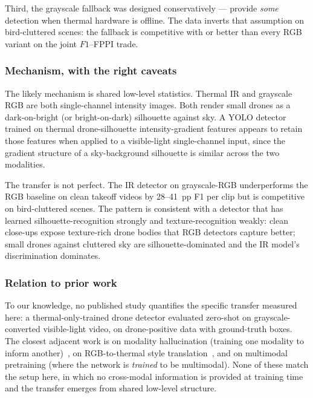 Third, the grayscale fallback was designed conservatively --- provide \emph{some} detection when thermal hardware is offline. The data inverts that assumption on bird-cluttered scenes: the fallback is competitive with or better than every RGB variant on the joint $F1$--FPPI trade.

\subsubsection{Mechanism, with the right caveats}

The likely mechanism is shared low-level statistics. Thermal IR and grayscale RGB are both single-channel intensity images. Both render small drones as a dark-on-bright (or bright-on-dark) silhouette against sky. A YOLO detector trained on thermal drone-silhouette intensity-gradient features appears to retain those features when applied to a visible-light single-channel input, since the gradient structure of a sky-background silhouette is similar across the two modalities.

The transfer is not perfect. The IR detector on grayscale-RGB underperforms the RGB baseline on clean takeoff videos by 28--41~pp F1 per clip but is competitive on bird-cluttered scenes. The pattern is consistent with a detector that has learned silhouette-recognition strongly and texture-recognition weakly: clean close-ups expose texture-rich drone bodies that RGB detectors capture better; small drones against cluttered sky are silhouette-dominated and the IR model's discrimination dominates.

\subsubsection{Relation to prior work}

To our knowledge, no published study quantifies the specific transfer measured here: a thermal-only-trained drone detector evaluated zero-shot on grayscale-converted visible-light video, on drone-positive data with ground-truth boxes. The closest adjacent work is on modality hallucination (training one modality to inform another)~\cite{hoffman2016modalityhallucination}, on RGB-to-thermal style translation~\cite{berg2018rgb2thermal,kniaz2018thermalgan}, and on multimodal pretraining (where the network is \emph{trained} to be multimodal). None of these match the setup here, in which no cross-modal information is provided at training time and the transfer emerges from shared low-level structure.

